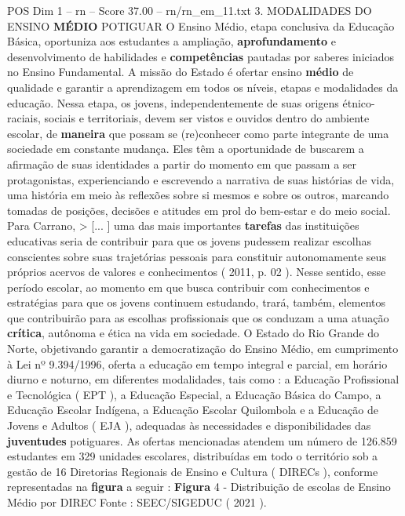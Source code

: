 \begin{textsample}{POS Dim 1 – rn – Score 37.00 – rn/rn\_em\_11.txt}  \label{ex:f1_pos_269}
3.
MODALIDADES DO ENSINO \textbf{MÉDIO} POTIGUAR O Ensino Médio, etapa conclusiva da Educação Básica, oportuniza aos estudantes a ampliação, \textbf{aprofundamento} e desenvolvimento de habilidades e \textbf{competências} pautadas por saberes iniciados no Ensino Fundamental.
A missão do Estado é ofertar ensino \textbf{médio} de qualidade e garantir a aprendizagem em todos os níveis, etapas e modalidades da educação.
Nessa etapa, os jovens, independentemente de suas origens étnico-raciais, sociais e territoriais, devem ser vistos e ouvidos dentro do ambiente escolar, de \textbf{maneira} que possam se (re)conhecer como parte integrante de uma sociedade em constante mudança.
Eles têm a oportunidade de buscarem a afirmação de suas identidades a partir do momento em que passam a ser protagonistas, experienciando e escrevendo a narrativa de suas histórias de vida, uma história em meio às reflexões sobre si mesmos e sobre os outros, marcando tomadas de posições, decisões e atitudes em prol do bem-estar e do meio social.
Para Carrano, > [... ] uma das mais importantes \textbf{tarefas} das instituições educativas seria de contribuir para que os jovens pudessem realizar escolhas conscientes sobre suas trajetórias pessoais para constituir autonomamente seus próprios acervos de valores e conhecimentos ( 2011, p. 02 ).
Nesse sentido, esse período escolar, ao momento em que busca contribuir com conhecimentos e estratégias para que os jovens continuem estudando, trará, também, elementos que contribuirão para as escolhas profissionais que os conduzam a uma atuação \textbf{crítica}, autônoma e ética na vida em sociedade.
O Estado do Rio Grande do Norte, objetivando garantir a democratização do Ensino Médio, em cumprimento à Lei nº 9.394/1996, oferta a educação em tempo integral e parcial, em horário diurno e noturno, em diferentes modalidades, tais como : a Educação Profissional e Tecnológica ( EPT ), a Educação Especial, a Educação Básica do Campo, a Educação Escolar Indígena, a Educação Escolar Quilombola e a Educação de Jovens e Adultos ( EJA ), adequadas às necessidades e disponibilidades das \textbf{juventudes} potiguares.
As ofertas mencionadas atendem um número de 126.859 estudantes em 329 unidades escolares, distribuídas em todo o território sob a gestão de 16 Diretorias Regionais de Ensino e Cultura ( DIRECs ), conforme representadas na \textbf{figura} a seguir : \textbf{Figura} 4 - Distribuição de escolas de Ensino Médio por DIREC Fonte : SEEC/SIGEDUC ( 2021 ).

\end{textsample}
